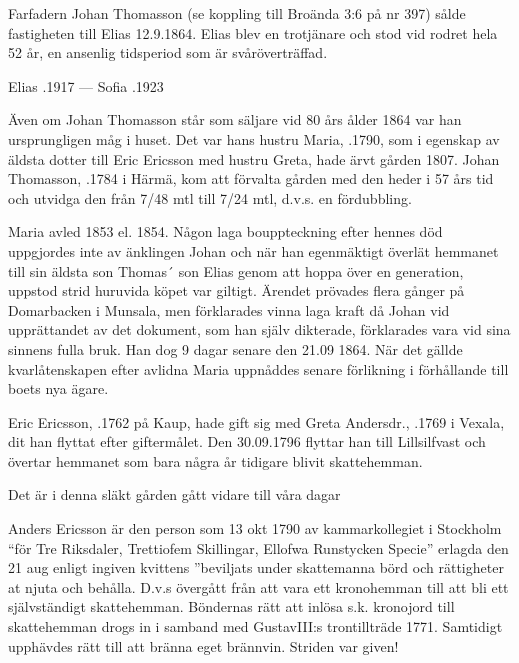 Farfadern Johan Thomasson (se koppling till Broända 3:6 på nr 397) sålde fastigheten till Elias 12.9.1864. Elias blev en trotjänare och stod vid rodret hela 52 år, en ansenlig tidsperiod som är svåröverträffad.

Elias .1917 --- Sofia .1923


%
Även om Johan Thomasson står som säljare vid 80 års ålder 1864 var han ursprungligen måg i huset. Det var hans hustru Maria, .1790, som i egenskap av äldsta dotter till Eric Ericsson med hustru Greta, hade ärvt gården 1807. Johan Thomasson, .1784 i Härmä, kom att förvalta gården med den heder i 57 års tid och utvidga den från 7/48 mtl till 7/24 mtl, d.v.s. en fördubbling.

Maria avled 1853 el. 1854. Någon laga bouppteckning efter hennes död uppgjordes inte av änklingen Johan och när han egenmäktigt överlät hemmanet till sin äldsta son Thomas´ son Elias genom att hoppa över en generation, uppstod strid huruvida köpet var giltigt. Ärendet prövades flera gånger på Domarbacken i Munsala, men förklarades vinna laga kraft då Johan vid upprättandet av det dokument, som han själv dikterade, förklarades vara vid sina sinnens fulla bruk. Han dog 9 dagar senare den 21.09 1864. När det gällde kvarlåtenskapen efter avlidna Maria uppnåddes senare förlikning i förhållande till boets nya ägare.


%
Eric Ericsson, .1762 på Kaup, hade gift sig med Greta Andersdr., .1769 i Vexala, dit han flyttat efter giftermålet. Den 30.09.1796 flyttar han till Lillsilfvast och övertar hemmanet som bara några år tidigare blivit skattehemman.
\begin{jhchildren}
  \item {}
  \item {}
  \item {}
\end{jhchildren}
Det är i denna släkt gården gått vidare till våra dagar


%
Anders Ericsson är den person som 13 okt 1790 av kammarkollegiet i Stockholm ``för Tre Riksdaler, Trettiofem Skillingar, Ellofwa Runstycken Specie'' erlagda den 21 aug enligt ingiven kvittens ”beviljats under skattemanna  börd och rättigheter at njuta och behålla. D.v.s övergått från att vara ett kronohemman till att bli ett självständigt skattehemman. Böndernas rätt att inlösa s.k. kronojord till skattehemman drogs in i samband med GustavIII:s trontillträde 1771. Samtidigt upphävdes rätt till att bränna eget brännvin. Striden var given!

